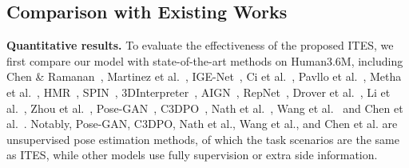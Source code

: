 \documentclass[letterpaper]{article} \usepackage{aaai21}  \usepackage{times}  \usepackage{helvet} \usepackage{courier}  \usepackage[hyphens]{url}  \usepackage{graphicx} \urlstyle{rm} \def\UrlFont{\rm}  \usepackage{natbib}  \usepackage{caption} \frenchspacing  \setlength{\pdfpagewidth}{8.5in}  \setlength{\pdfpageheight}{11in}
\begin{document}
\begin{table}[t]
\begin{center}
\small
{}
\end{center}
\vspace{-5mm}
\end{table}

\subsection{Comparison with Existing Works}

\noindent\textbf{Quantitative results.}
To evaluate the effectiveness of the proposed ITES, we first compare our model with state-of-the-art methods on Human3.6M, including 
Chen \& Ramanan~\cite{chen20173d}, 
Martinez et al.~\cite{martinez2017simple}, 
IGE-Net~\cite{jack2019ige}, 
Ci et al.~\cite{ci2019optimizing}, 
Pavllo et al.~\cite{pavllo20193d}, 
Metha et al.~\cite{mehta2017monocular},
HMR~\cite{kanazawa2018end},
SPIN~\cite{kolotouros2019learning},
3DInterpreter~\cite{wu2016single}, 
AIGN~\cite{tung2017adversarial}, 
RepNet~\cite{wandt2019repnet}, 
Drover et al.~\cite{drover2018can}, 
Li et al.~\cite{li2020geometry}, 
Zhou et al.~\cite{zhou2017towards},
Pose-GAN~\cite{kudo2018unsupervised}, 
C3DPO~\cite{novotny2019c3dpo}, 
Nath et al.~\cite{nath2020kinematic},
Wang et al.~\cite{wang2019distill} and 
Chen et al.~\cite{chen2019unsupervised}. 
Notably, Pose-GAN, C3DPO, Nath et al., Wang et al., and Chen et al. are unsupervised pose estimation methods, of which the task scenarios are the same as ITES, while other models use fully supervision or extra side information.
\end{document}
